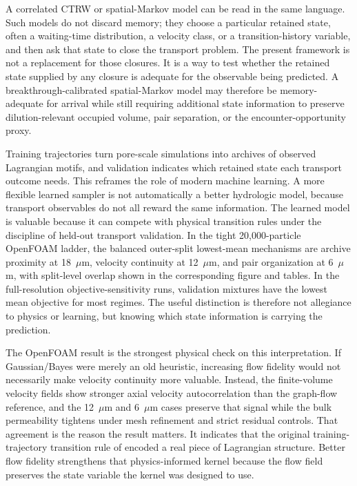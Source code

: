 \documentclass[11pt]{article}
\newcommand{\gb}{Gaussian/Bayes}
\begin{document}
A correlated CTRW or spatial-Markov model can be read in the same language. Such models do not discard memory; they choose a particular retained state, often a waiting-time distribution, a velocity class, or a transition-history variable, and then ask that state to close the transport problem. The present framework is not a replacement for those closures. It is a way to test whether the retained state supplied by any closure is adequate for the observable being predicted. A breakthrough-calibrated spatial-Markov model may therefore be memory-adequate for arrival while still requiring additional state information to preserve dilution-relevant occupied volume, pair separation, or the encounter-opportunity proxy.

Training trajectories turn pore-scale simulations into archives of observed Lagrangian motifs, and validation indicates which retained state each transport outcome needs. This reframes the role of modern machine learning. A more flexible learned sampler is not automatically a better hydrologic model, because transport observables do not all reward the same information. The learned model is valuable because it can compete with physical transition rules under the discipline of held-out transport validation. In the tight 20,000-particle OpenFOAM ladder, the balanced outer-split lowest-mean mechanisms are archive proximity at 18~$\mu$m, velocity continuity at 12~$\mu$m, and pair organization at 6~$\mu$m, with split-level overlap shown in the corresponding figure and tables. In the full-resolution objective-sensitivity runs, validation mixtures have the lowest mean objective for most regimes. The useful distinction is therefore not allegiance to physics or learning, but knowing which state information is carrying the prediction.

The OpenFOAM result is the strongest physical check on this interpretation. If \gb{} were merely an old heuristic, increasing flow fidelity would not necessarily make velocity continuity more valuable. Instead, the finite-volume velocity fields show stronger axial velocity autocorrelation than the graph-flow reference, and the 12~$\mu$m and 6~$\mu$m cases preserve that signal while the bulk permeability tightens under mesh refinement and strict residual controls. That agreement is the reason the result matters. It indicates that the original training-trajectory transition rule of \citet{Most2019} encoded a real piece of Lagrangian structure. Better flow fidelity strengthens that physics-informed kernel because the flow field preserves the state variable the kernel was designed to use.
\end{document}
